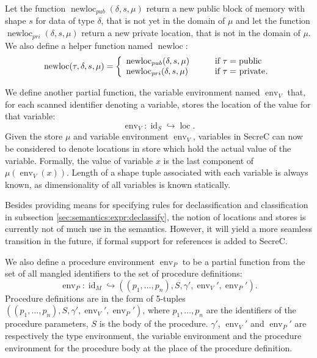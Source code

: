 \documentclass[a4paper, 10pt, draft]{report}
\DeclareMathOperator*{\env}{env}
\DeclareMathOperator*{\newloc}{newloc}
\newcommand{\mycode}[1]{\ensuremath{\mbox{\lstinline{#1}}}}
\begin{document}
Let the function $\newloc_{pub}\left(\delta, s, \mu\right)$ return a new public
block of memory with shape $s$ for data of type $\delta$, that is not yet in
the domain of $\mu$ and let the function $\newloc_{pri}\left(\delta, s,
\mu\right)$ return a new private location, that is not in the domain of $\mu$.
We also define a helper function named $\newloc$:
\[
 \newloc\!\left(\tau, \delta, s, \mu\right) = \left\{
    \begin{array}{ll}
       \newloc_{pub}\!\left(\delta, s, \mu\right) & \qquad \mbox{if}\ \tau = \mycode{public} \\
       \newloc_{pri}\!\left(\delta, s, \mu\right) & \qquad \mbox{if}\ \tau = \mycode{private}. \\
    \end{array}
 \right.
\]

We define another partial function, the variable environment named
$\operatorname{env}_V$ that, for each scanned identifier denoting a variable,
  stores the location of the value for that variable:
\[
\operatorname{env}_V : \operatorname{id}_S \hookrightarrow \operatorname{loc}.
\]
Given the store $\mu$ and variable environment $\operatorname{env}_V$,
variables in SecreC can now be considered to denote locations in store which
hold the actual value of the variable. Formally, the value of variable $x$ is
the last component of $\mu\!\left( \env_V\!\left( x \right) \right)$. Length of a shape
tuple associated with each variable is always known, as dimensionality of all
variables is known statically.

Besides providing means for specifying rules for declassification and
classification in subsection \ref{sec:semantics:expr:declassify}, the notion of
locations and stores is currently not of much use in the semantics. However, it
will yield a more seamless transition in the future, if formal support for
references is added to SecreC.

We also define a procedure environment $\operatorname{env}_P$ to be a partial
function from the set of all mangled identifiers to the set of procedure
definitions:
\[
\operatorname{env}_P : \operatorname{id}_M \hookrightarrow \left(\left(p_1, \ldots, p_n\right), S, \gamma', \operatorname{env}_V', \operatorname{env}_P' \right).
\]
Procedure definitions are in the form of 5-tuples $\left(\left(p_1, \ldots,
p_n\right), S, \gamma', \operatorname{env}_V', \operatorname{env}_P'
\right)$, where $p_1, \ldots, p_n$ are the identifiers of the procedure
parameters, $S$ is the body of the procedure. $\gamma'$,
$\operatorname{env}_V'$ and $\operatorname{env}_P'$ are respectively the type
environment, the variable environment and the procedure environment for the
procedure body at the place of the procedure definition.
\end{document}
